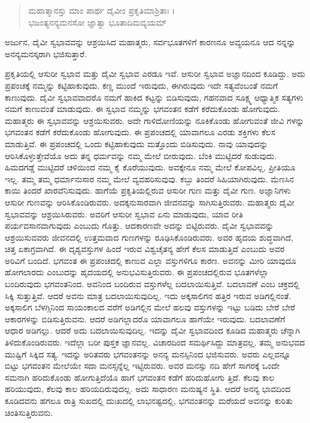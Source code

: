 \begin{verse}
ಮಹಾತ್ಮಾನಸ್ತು ಮಾಂ ಪಾರ್ಥ ದೈವೀಂ ಪ್ರಕೃತಿಮಾಶ್ರಿತಾಃ ।\\ಭಜಂತ್ಯನನ್ಯಮನಸೋ ಜ್ಞಾತ್ವಾ ಭೂತಾದಿಮವ್ಯಯಮ್ 
\end{verse}

{\small ಅರ್ಜುನ, ದೈವೀ ಸ್ವಭಾವವನ್ನು ಆಶ್ರಯಿಸಿದ ಮಹಾತ್ಮರು, ಸರ್ವಭೂತಗಳಿಗೆ ಕಾರಣನೂ ಅವ್ಯಯನೂ ಆದ ನನ್ನನ್ನು ಅನನ್ಯಮನಸ್ಕರಾಗಿ ಭಜಿಸುತ್ತಾರೆ.}

ಪ್ರಕೃತಿಯಲ್ಲಿ ಆಸುರೀ ಸ್ವಭಾವ ಮತ್ತು ದೈವೀ ಸ್ವಭಾವ ಎರಡೂ ಇವೆ. ಆಸುರೀ ಸ್ವಭಾವ ಅಜ್ಞಾನದಿಂದ ಕೂಡಿದ್ದು. ಅದು ಪ್ರಪಂಚಕ್ಕೆ ನಮ್ಮನ್ನು ಕಟ್ಟಿಹಾಕುವುದು. ಕಣ್ಣ ಮುಂದೆ ಇರುವುದು, ಈಗಿರುವುದು ಇದೇ ಸತ್ಯವೆಂಬಂತೆ ನಮಗೆ ಕಾಣುವುದು. ದೈವೀ ಸ್ವಭಾವವಾದರೊ ನಮಗೆ ಹಾಕಿದ ಕಟ್ಟನ್ನು ಬಿಡಿಸುವುದು, ಗಹನವಾದ ಸೂಕ್ಷ್ಮ ಆಧ್ಯಾತ್ಮಿಕ ಸತ್ಯಗಳು ನಮಗೆ ಕಾಣುವಂತೆ ಮಾಡುವುದು. ಈ ಸ್ವಭಾವ ನಮ್ಮನ್ನು ಭಗವಂತನ ಕಡೆಗೆ ಕರೆದುಕೊಂಡು ಹೋಗುವುದು. ಮಹಾತ್ಮರು ಈ ಸ್ವಭಾವವನ್ನು ಆಶ್ರಯಿಸುವರು. ಅದೇ ಗಾಳಿದೋಣಿಯನ್ನು ನೂಕಿಕೊಂಡು ಹೋಗುವಂತೆ ಜೀವಿ ಗಳನ್ನು ಭಗವಂತನ ಕಡೆಗೆ ಕರೆದುಕೊಂಡು ಹೋಗುವುದು. ಈ ಪ್ರಪಂಚದಲ್ಲಿ ಯಾವಾಗಲೂ ಎರಡು ಶಕ್ತಿಗಳು ಕೆಲಸ ಮಾಡುತ್ತಿವೆ. ಈ ಪ್ರಪಂಚದಲ್ಲಿ ಒಂದು ಕಟ್ಟಿಹಾಕುವುದು ಮತ್ತೊಂದು ಬಿಡಿಸುವುದು. ನಾವು ಯಾವುದನ್ನು ಆರಿಸಿಕೊಳ್ಳುತ್ತೇವೆಯೊ ಅದು ತನ್ನ ಧರ್ಮವನ್ನು ನಮ್ಮ ಮೇಲೆ ಬೀರುವುದು. ಬೆಂಕಿ ಮುಟ್ಟಿದರೆ ಸುಡುವುದು. ಹಿಮದಗಡ್ಡೆ ಮುಟ್ಟಿದರೆ ಚಳಿಯಿಂದ ನಮ್ಮ ಕೈ ಕೊರೆಯುವುದು. ಅವಕ್ಕೇನೂ ನಮ್ಮ ಮೇಲೆ ಕೋಪವಿಲ್ಲ, ಪ್ರೀತಿಯೂ ಇಲ್ಲ. ತಮ್ಮ ತಮ್ಮ ಧರ್ಮಾನುಸಾರ ನಮ್ಮ ಮೇಲೆ ವ್ಯವಹರಿಸುವುವು. ಕಬ್ಬು ತಿಂದರೆ ಸಿಹಿಯಾಗಿರುವುದು. ಮೆಣಸಿನ ಕಾಯಿ ತಿಂದರೆ ಖಾರವೆನಿಸುವುದು. ಹಾಗೆಯೆ ಪ್ರಕೃತಿಯಲ್ಲಿರುವ ಆಸುರೀ ಗುಣ ಮತ್ತು ದೈವೀ ಗುಣ. ಅಜ್ಞಾನಿಗಳು ಆಸುರೀ ಗುಣವನ್ನು ಆರಿಸಿಕೊಂಡಿರುವರು. ಅದಕ್ಕನುಸಾರವಾಗಿ ಜೀವನವನ್ನು ಸಾಗಿಸುತ್ತಿರುವರು. ಮಹಾತ್ಮರು ದೈವೀ ಸ್ವಭಾವವನ್ನು ಆಶ್ರಯಿಸಿರುವರು. ಅವರಿಗೆ ಆಸುರೀ ಸ್ವಭಾವ ಏನು ಮಾಡುವುದು, ಯಾವ ರೀತಿ ಪರ್ಯವಸಾನವಾಗುವುದು ಎಂಬುದು ಗೊತ್ತು. ಆದಕಾರಣವೇ ಅದನ್ನು ಬಿಟ್ಟಿರುವರು. ದೈವೀ ಸ್ವಭಾವವನ್ನು ಆಶ್ರಯಿಸುವವರು ಜೀವನದಲ್ಲಿ ಉತ್ತಮವಾದ ಗುಣಗಳನ್ನು ರೂಢಿಸಿಕೊಂಡಿರುವರು. ಅವರ ಹೃದಯ ಶುದ್ಧವಾಗಿದೆ, ಚಿತ್ತ ಏಕಾಗ್ರವಾಗಿದೆ. ಈ ದೃಶ್ಯವಸ್ತುಗಳ ಹಿಂದೆ ಇರುವ ವಿಶ್ವಚೈತನ್ಯ ಹೇಗೆ ಕೆಲಸ ಮಾಡುತ್ತಿದೆ ಎಂಬುದು ಅವರ ಅರಿವಿಗೆ ಬಂದಿದೆ. ಭಗವಂತ ಈ ಪ್ರಪಂಚದಲ್ಲಿ ಕಾಣುವ ಎಲ್ಲಾ ವಸ್ತುಗಳಿಗೂ ಕಾರಣ. ಅವನನ್ನು ಮೀರಿ ಯಾವುದೂ ಹೋಗಲಾರದು ಎಂಬುದನ್ನು ಹೃದಯದಲ್ಲಿ ಅನುಭವಿಸುತ್ತಿರುವರು. ಈ ಪ್ರಪಂಚದಲ್ಲಿರುವ ಭೂತಗಳೆಲ್ಲಾ ಬಂದಿರುವುದು ಭಗವಂತನಿಂದ. ಅವನಿಂದ ಬಂದಿರುವ ವಸ್ತುಗಳೆಲ್ಲ ಬದಲಾಯಿಸುತ್ತಿವೆ. ಬದಲಾವಣೆ ಎಂಬ ಚಕ್ರದಲ್ಲಿ ಸಿಕ್ಕಿ ಸುತ್ತುತ್ತಿವೆ. ಆದರೆ ಅವನು ಮಾತ್ರ ಬದಲಾಯಿಸುವುದಿಲ್ಲ. ಇದು ಅಕ್ಕಸಾಲಿಗನ ಹತ್ತಿರ ಇರುವ ಅಡಿಗಲ್ಲಿನಂತೆ. ಅಕ್ಕಸಾಲಿಗ ಬೆಳಗ್ಗಿನಿಂದ ಸಾಯಂಕಾಲದ ವರೆಗೆ ಅಡಿಗಲ್ಲಿನ ಮೇಲೆ ಹಲವು ವಸ್ತುಗಳನ್ನು ಇಟ್ಟು ಬಡಿದು ಬೇರೆ ಬೇರೆ ಆಕಾರಗಳನ್ನು ಬಿಡಿಸುತ್ತಿರುವನು. ಆದರೆ ಅಡಿಗಲ್ಲಾದರೊ ಯಾವಾಗಲೂ ಹಾಗೆಯೇ ಇರುವುದು. ಬದಲಾವಣೆಗೆ ಆಧಾರ ಅಡಿಗಲ್ಲು. ಆದರೆ ಅದು ಬದಲಾಯಿಸುವುದಿಲ್ಲ. ಇದನ್ನು ದೈವೀ ಸ್ವಭಾವದಿಂದ ಕೂಡಿದ ಮಹಾತ್ಮರು ಚೆನ್ನಾಗಿ ತಿಳಿದುಕೊಂಡಿರುವರು. ಇದೆಲ್ಲಾ ಬರೀ ಪುಸ್ತಕ ಜ್ಞಾನವಲ್ಲ. ವಿಚಾರದಿಂದ ಸಮರ್ಥಿಸಿದ್ದು ಮಾತ್ರವಲ್ಲ. ತಮ್ಮ ಅನುಭವದ ಮುಷ್ಟಿಗೆ ಸಿಕ್ಕಿದ ಸತ್ಯ. ಇದನ್ನು ಅರಿತವರು ಭಗವಂತನನ್ನು ಅನನ್ಯ ಮನಸ್ಸಿನಿಂದ ಭಜಿಸುವರು. ಅವರು ಎಲ್ಲವನ್ನೂ ಬಿಟ್ಟು ಭಗವಂತನ ಮೇಲೆಯೇ ಸದಾ ಮನಸ್ಸನ್ನೆಲ್ಲ ಇಟ್ಟಿರುವರು. ಅವರ ಮನಸ್ಸು ನದಿ ಹೇಗೆ ಸಾಗರಕ್ಕೆ ಒಂದೇ ಸಮನಾಗಿ ಹರಿದುಕೊಂಡು ಹೋಗುತ್ತಿದೆಯೊ ಹಾಗೆ ಭಗವಂತನ ಕಡೆಗೆ ಹರಿದುಹೋಗು ತ್ತಿದೆ. ಕೆಲವು ಕಾಲ ಹರಿಯುವುದು, ಕೆಲವು ಕಾಲ ಹರಿಯದಿರುವುದಲ್ಲ. ಅದು ಸಾಧಾರಣ ಮನುಷ್ಯನ ಸ್ಥಿತಿ. ಆದರೆ ಅನನ್ಯ ಭಾವದಿಂದ ಕೂಡಿದವನು ಹಗಲೂ ರಾತ್ರಿ ಸುಖದಲ್ಲಿ ದುಃಖದಲ್ಲಿ ಲಾಭನಷ್ಟದಲ್ಲಿ, ಭಗವಂತನನ್ನು ಮರೆಯದೆ ಅವನನ್ನು ಕುರಿತು ಚಿಂತಿಸುತ್ತಿರುವನು.

